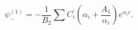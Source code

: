 \begin{equation}
\label{19}\psi _{-}^{(1)}=-\frac 1{B_2}\sum C_i^{\prime }\left( \alpha _i+ 
\frac{A_1}{\alpha _i}\right) e^{\alpha _ir}. 
\end{equation}

